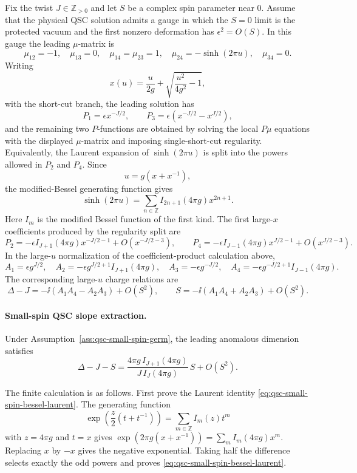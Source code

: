 \begin{assumption}
\label{ass:qsc-small-spin-germ}
Fix the twist \(J\in\mathbb Z_{>0}\) and let \(S\) be a complex spin parameter
near \(0\).  Assume that the physical QSC solution admits a gauge in which the
\(S=0\) limit is the protected vacuum and the first nonzero deformation has
\(\epsilon^2=O(S)\).  In this gauge the leading \(\mu\)-matrix is
\[
  \mu_{12}=-1,\quad \mu_{13}=0,\quad
  \mu_{14}=\mu_{23}=1,\quad \mu_{24}=-\sinh(2\pi u),\quad \mu_{34}=0 .
\]
Writing
\[
  x(u)=\frac{u}{2g}+\sqrt{\frac{u^2}{4g^2}-1},
\]
with the short-cut branch, the leading solution has
\[
  P_1=\epsilon x^{-J/2},
  \qquad
  P_3=\epsilon(x^{-J/2}-x^{J/2}),
\]
and the remaining two \(P\)-functions are obtained by solving the local
\(P\mu\) equations with the displayed \(\mu\)-matrix and imposing
single-short-cut regularity.  Equivalently, the Laurent expansion of
\(\sinh(2\pi u)\) is split into the powers allowed in \(P_2\) and \(P_4\).
Since
\[
  u=g(x+x^{-1}),
\]
the modified-Bessel generating function gives
\begin{equation}
  \sinh(2\pi u)
  =
  \sum_{n\in\mathbb Z} I_{2n+1}(4\pi g)x^{2n+1}.
  \label{eq:qsc-small-spin-bessel-laurent}
\end{equation}
Here \(I_m\) is the modified Bessel function of the first kind.  The first
large-\(x\) coefficients produced by the regularity split are
\[
  P_2
  =
  -\epsilon I_{J+1}(4\pi g)x^{-J/2-1}
  +O(x^{-J/2-3}),
  \qquad
  P_4
  =
  -\epsilon I_{J-1}(4\pi g)x^{J/2-1}
  +O(x^{J/2-3}).
\]
In the large-\(u\) normalization of the coefficient-product calculation above,
\[
  A_1=\epsilon g^{J/2},\quad
  A_2=-\epsilon g^{J/2+1}I_{J+1}(4\pi g),\quad
  A_3=-\epsilon g^{-J/2},\quad
  A_4=-\epsilon g^{-J/2+1}I_{J-1}(4\pi g).
\]
The corresponding large-\(u\) charge relations are
\[
  \Delta-J=-\ii(A_1A_4-A_2A_3)+O(S^2),
  \qquad
  S=-\ii(A_1A_4+A_2A_3)+O(S^2).
\]
\end{assumption}

\paragraph{Small-spin QSC slope extraction.}
\label{par:qsc-small-spin-bessel-slope}
Under Assumption~\ref{ass:qsc-small-spin-germ}, the leading anomalous
dimension satisfies
\[
  \Delta-J-S
  =
  \frac{4\pi g\,I_{J+1}(4\pi g)}{J\,I_J(4\pi g)}\,S+O(S^2).
\]

The finite calculation is as follows.  First prove the Laurent identity
\eqref{eq:qsc-small-spin-bessel-laurent}.  The generating function
\[
  \exp\left(\frac{z}{2}(t+t^{-1})\right)
  =
  \sum_{m\in\mathbb Z}I_m(z)t^m
\]
with \(z=4\pi g\) and \(t=x\) gives
\(\exp(2\pi g(x+x^{-1}))=\sum_m I_m(4\pi g)x^m\).  Replacing
\(x\) by \(-x\) gives the negative exponential.  Taking half the difference
selects exactly the odd powers and proves
\eqref{eq:qsc-small-spin-bessel-laurent}.

